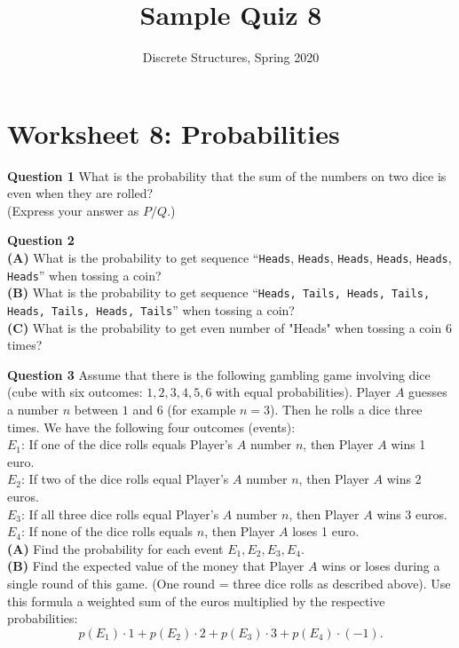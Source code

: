 \documentclass[jou]{apa6}
\title{Sample Quiz 8}
\author{Discrete Structures, Spring 2020}
\affiliation{RBS}
\begin{document}

\twocolumn
\section{Worksheet 8: Probabilities}

\vspace{10pt}
{\bf Question 1} 
What is the probability that the sum of the numbers on two dice is even when they are rolled?\\
(Express your answer as $P/Q$.)

\vspace{10pt}
{\bf Question 2}\\
{\bf (A)} What is the probability to get sequence ``{\tt Heads}, {\tt Heads}, {\tt Heads}, 
{\tt Heads}, {\tt Heads}, {\tt Heads}'' when 
tossing a coin?\\
{\bf (B)} What is the probability to get sequence ``{\tt Heads, Tails, Heads, Tails, Heads, Tails, Heads, Tails}'' when 
tossing a coin?\\
{\bf (C)} What is the probability to get even number of "Heads" when tossing a coin 6 times?

\vspace{10pt}
{\bf Question 3}
Assume that there is the following gambling game involving dice (cube with six outcomes: $1,2,3,4,5,6$ with 
equal probabilities). Player $A$ guesses a number $n$ between $1$ and $6$ (for example $n = 3$). Then he rolls a dice three times. 
We have the following four outcomes (events):\\
$E_1$: If one of the dice rolls equals Player's $A$ number $n$, then Player $A$ wins 1 euro.\\
$E_2$: If two of the dice rolls equal Player's $A$ number $n$, then Player $A$ wins 2 euros.\\
$E_3$: If all three dice rolls equal Player's $A$ number $n$, then Player $A$ wins 3 euros.\\
$E_4$: If none of the dice rolls equals $n$, then Player $A$ loses 1 euro.\\
{\bf (A)} Find the probability for each event $E_1,E_2,E_3,E_4$.\\
{\bf (B)} Find the expected value of the money that Player $A$ wins or loses during a single round of this game. (One round = three 
dice rolls as described above). Use this formula \textendash{} a weighted sum of the euros multiplied by the respective probabilities:
$$p(E_1)\cdot 1 + p(E_2)\cdot 2 + p(E_3)\cdot 3 + p(E_4)\cdot (-1).$$
\end{document}
